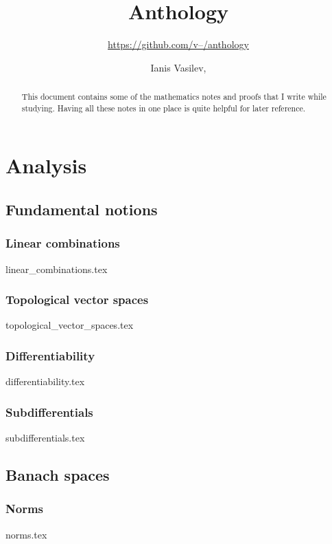 \documentclass[numbers=endperiod, bibliography=totocnumbered]{scrartcl}
\title{Anthology}
\subtitle{\href{https://github.com/v--/anthology}{https://github.com/v--/anthology}}
\author{Ianis Vasilev, \Email{ianis@ivasilev.net}}
\date{}
\begin{document}
\sloppy

\maketitle

\begin{abstract}
  This document contains some of the mathematics notes and proofs that I write while studying. Having all these notes in one place is quite helpful for later reference.
\end{abstract}

\tableofcontents

\section{Analysis}\label{sec:analysis}
\subsection{Fundamental notions}\label{sec:analysis/fundamental_notions}
\subsubsection{Linear combinations}\label{sec:linear_combinations}
{linear_combinations.tex}
\subsubsection{Topological vector spaces}\label{sec:topological_vector_spaces}
{topological_vector_spaces.tex}
\subsubsection{Differentiability}\label{sec:differentiability}
{differentiability.tex}
\subsubsection{Subdifferentials}\label{sec:subdifferentials}
{subdifferentials.tex}

\subsection{Banach spaces}\label{sec:banach_spaces}
\subsubsection{Norms}\label{sec:norms}
{norms.tex}
\end{document}
